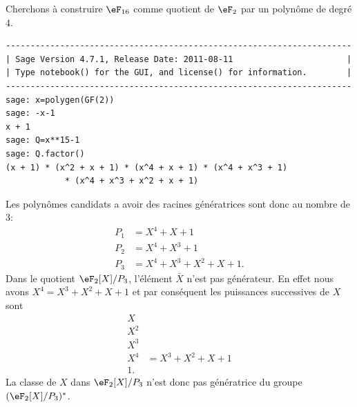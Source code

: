 \begin{example}     \label{ExemWUdrcs}
    Cherchons à construire \( \eF_{16}\) comme quotient de \( \eF_2\) par un polynôme de degré \( 4\).
    \begin{verbatim}
----------------------------------------------------------------------
| Sage Version 4.7.1, Release Date: 2011-08-11                       |
| Type notebook() for the GUI, and license() for information.        |
----------------------------------------------------------------------
sage: x=polygen(GF(2))
sage: -x-1
x + 1
sage: Q=x**15-1
sage: Q.factor()
(x + 1) * (x^2 + x + 1) * (x^4 + x + 1) * (x^4 + x^3 + 1) 
            * (x^4 + x^3 + x^2 + x + 1)
    \end{verbatim}
    Les polynômes candidats a avoir des racines génératrices sont donc au nombre de \( 3\):
    \begin{subequations}
        \begin{align}
            P_1&=X^4+X+1\\
            P_2&=X^4+X^3+1\\
            P_3&=X^4+X^3+X^2+X+1.
        \end{align}
    \end{subequations}
    Dans le quotient \( \eF_2[X]/P_3\), l'élément \( \bar X\) n'est pas générateur. En effet nous avons \( X^4=X^3+X^2+X+1\) et par conséquent les puissances successives de \( X\) sont
    \begin{subequations}
        \begin{align}
            X&\\
            X^2&\\
            X^3&\\
            X^4&=X^3+X^2+X+1\\
            1.
        \end{align}
    \end{subequations}
    La classe de \( X\) dans \( \eF_2[X]/P_3\) n'est donc pas génératrice du groupe \( (\eF_2[X]/P_3)^*\).


\end{example}
